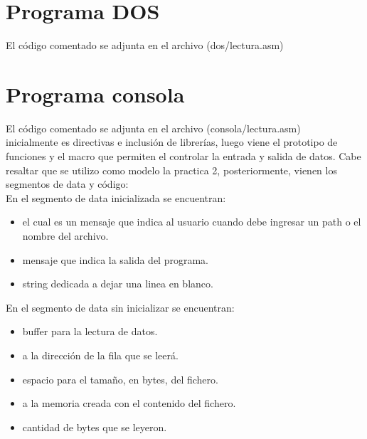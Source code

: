 


\section{Programa DOS}

El código comentado se adjunta en el archivo (dos/lectura.asm)




\section{Programa consola}

El código comentado se adjunta en el archivo (consola/lectura.asm)\\



inicialmente es directivas e inclusión de librerías, luego viene el prototipo
de funciones y el macro que permiten el controlar la entrada y salida de datos.
Cabe resaltar que se utilizo como modelo la practica 2, posteriormente,
vienen los segmentos de data y código:\\


En el segmento de data inicializada  se encuentran:

\begin{itemize}
    \item {} el cual es un mensaje que indica al usuario cuando
        debe ingresar un path o el nombre del archivo.

    \item {} mensaje que indica la salida del programa.

    \item {} string dedicada a dejar una linea en blanco.
\end{itemize}

\vspace{0.5cm}

En el segmento de data sin inicializar  se encuentran:

\begin{itemize}
    \item {} buffer para la lectura de datos.

    \item {}  a la dirección de la fila que se
        leerá.

    \item {} espacio para el tamaño, en bytes, del fichero.

    \item {}  a la memoria creada con el contenido
        del fichero.

    \item {} cantidad de bytes que se leyeron.

\end{itemize}

